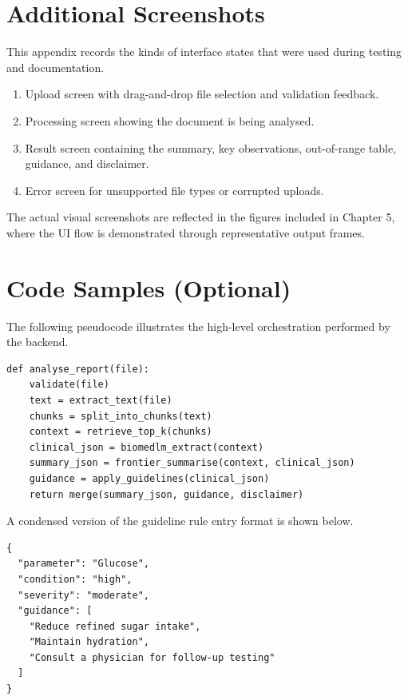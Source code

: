 \chapter{Additional Screenshots}
This appendix records the kinds of interface states that were used during testing and documentation.

\begin{enumerate}
    \item Upload screen with drag-and-drop file selection and validation feedback.
    \item Processing screen showing the document is being analysed.
    \item Result screen containing the summary, key observations, out-of-range table, guidance, and disclaimer.
    \item Error screen for unsupported file types or corrupted uploads.
\end{enumerate}

The actual visual screenshots are reflected in the figures included in Chapter 5, where the UI flow is demonstrated through representative output frames.

\chapter{Code Samples (Optional)}
The following pseudocode illustrates the high-level orchestration performed by the backend.

\begin{verbatim}
def analyse_report(file):
    validate(file)
    text = extract_text(file)
    chunks = split_into_chunks(text)
    context = retrieve_top_k(chunks)
    clinical_json = biomedlm_extract(context)
    summary_json = frontier_summarise(context, clinical_json)
    guidance = apply_guidelines(clinical_json)
    return merge(summary_json, guidance, disclaimer)
\end{verbatim}

A condensed version of the guideline rule entry format is shown below.

\begin{verbatim}
{
  "parameter": "Glucose",
  "condition": "high",
  "severity": "moderate",
  "guidance": [
    "Reduce refined sugar intake",
    "Maintain hydration",
    "Consult a physician for follow-up testing"
  ]
}
\end{verbatim}


